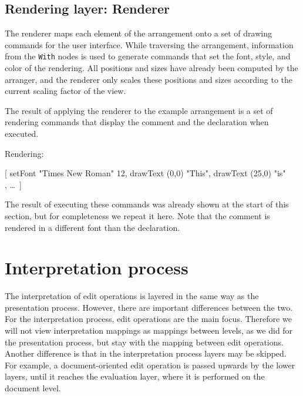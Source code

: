 %																
\subsection{Rendering layer: Renderer} \label{sect:renderer}

The renderer maps each element of the arrangement onto a set of drawing commands for the user interface. While traversing the arrangement, information from the \verb|With| nodes is used to generate commands that set the font, style, and color of the rendering. All positions and sizes have already been computed by the arranger, and the renderer only scales these positions and sizes according to the current scaling factor of the view. 


 The result of applying the renderer to the example arrangement is a set of rendering commands that display the comment and the declaration when executed.


Rendering:
\small \ttfamily

[ setFont "Times New Roman" 12,  drawText (0,0) "This", drawText (25,0) "is"\\
, \dots ~]
 
\rmfamily \normalsize
The result of executing these commands was already shown at the start of this section, but for completeness we repeat it here. Note that the comment is rendered in a different font than the declaration. 

\begin{center}
\end{center}

%																
%																
%																
\section{Interpretation process} \label{sect:intrProcess}

The interpretation of edit operations is layered in the same way as the presentation process. However, there are important differences between the two. For the interpretation process, edit operations are the main focus. Therefore we will not view interpretation mappings as mappings between levels, as we did for the presentation process, but stay with the mapping between edit operations. \bc Another difference is that in the interpretation process layers may be skipped. For example, a document-oriented edit operation is passed upwards by the lower layers, until it reaches the evaluation layer, where it is performed on the document level. \ec



